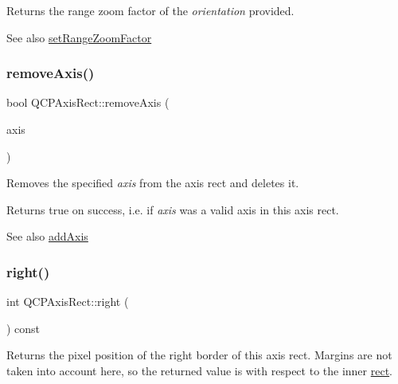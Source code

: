 Returns the range zoom factor of the {\itshape orientation} provided.

\begin{DoxySeeAlso}{See also}
\hyperlink{class_q_c_p_axis_rect_a895d7ac745ea614e04056244b3c138ac}{set\+Range\+Zoom\+Factor} 
\end{DoxySeeAlso}
\hypertarget{class_q_c_p_axis_rect_a03c39cd9704f0d36fb6cf980cdddcbaa}{}\label{class_q_c_p_axis_rect_a03c39cd9704f0d36fb6cf980cdddcbaa} 
\subsubsection{\texorpdfstring{remove\+Axis()}{removeAxis()}}
{\footnotesize\ttfamily bool Q\+C\+P\+Axis\+Rect\+::remove\+Axis (\begin{DoxyParamCaption}\item[{\hyperlink{class_q_c_p_axis}{Q\+C\+P\+Axis} $\ast$}]{axis }\end{DoxyParamCaption})}

Removes the specified {\itshape axis} from the axis rect and deletes it.

Returns true on success, i.\+e. if {\itshape axis} was a valid axis in this axis rect.

\begin{DoxySeeAlso}{See also}
\hyperlink{class_q_c_p_axis_rect_a2dc336092ccc57d44a46194c8a23e4f4}{add\+Axis} 
\end{DoxySeeAlso}
\hypertarget{class_q_c_p_axis_rect_a3f819d4a1b2193723d1fdafc573eea10}{}\label{class_q_c_p_axis_rect_a3f819d4a1b2193723d1fdafc573eea10} 
\subsubsection{\texorpdfstring{right()}{right()}}
{\footnotesize\ttfamily int Q\+C\+P\+Axis\+Rect\+::right (\begin{DoxyParamCaption}{ }\end{DoxyParamCaption}) const\hspace{0.3cm}{\ttfamily [inline]}}

Returns the pixel position of the right border of this axis rect. Margins are not taken into account here, so the returned value is with respect to the inner \hyperlink{class_q_c_p_layout_element_a208effccfe2cca4a0eaf9393e60f2dd4}{rect}. \hypertarget{class_q_c_p_axis_rect_af615ab5e52b8e0a9a0eff415b6559db5}{}\label{class_q_c_p_axis_rect_af615ab5e52b8e0a9a0eff415b6559db5} 
